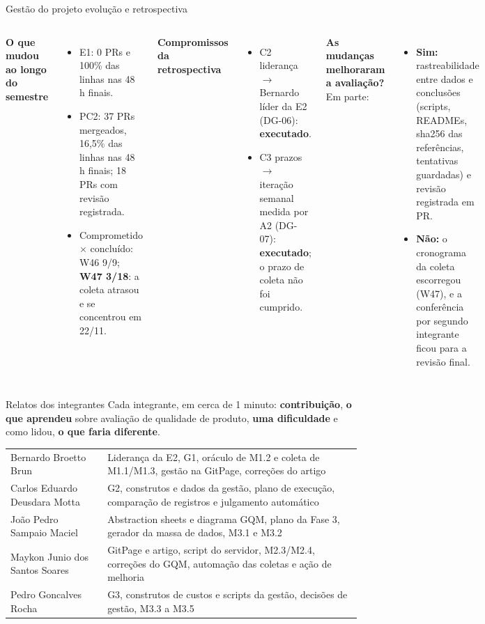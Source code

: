\documentclass[aspectratio=169,10pt]{beamer}
\begin{document}
\begin{frame}{Gestão do projeto \textperiodcentered{} evolução e retrospectiva}
\small
\begin{columns}[T]
\textbf{O que mudou ao longo do semestre}
\begin{itemize}\scriptsize
\item E1: 0 PRs e 100\% das linhas nas 48 h finais.
\item PC2: 37 PRs mergeados, 16,5\% das linhas nas 48 h finais; 18 PRs com revisão registrada.
\item Comprometido $\times$ concluído: W46 9/9; \textbf{W47 3/18}: a coleta atrasou e se concentrou em 22/11.
\end{itemize}
\textbf{Compromissos da retrospectiva}
\begin{itemize}\scriptsize
\item C2 liderança $\rightarrow$ Bernardo líder da E2 (DG-06): \textbf{executado}.
\item C3 prazos $\rightarrow$ iteração semanal medida por A2 (DG-07): \textbf{executado}; o prazo de coleta não foi cumprido.
\end{itemize}
\textbf{As mudanças melhoraram a avaliação?} Em parte:
\begin{itemize}\scriptsize
\item \textbf{Sim:} rastreabilidade entre dados e conclusões (scripts, READMEs, sha256 das referências, tentativas guardadas) e revisão registrada em PR.
\item \textbf{Não:} o cronograma da coleta escorregou (W47), e a conferência por segundo integrante ficou para a revisão final.
\end{itemize}
\end{columns}
\end{frame}

\begin{frame}{Relatos dos integrantes}
\scriptsize
Cada integrante, em cerca de 1 minuto: \textbf{contribuição}, \textbf{o que aprendeu} sobre avaliação de qualidade de produto, \textbf{uma dificuldade} e como lidou, \textbf{o que faria diferente}.\\[0.6em]
\begin{tabularx}{\linewidth}{p{3.6cm}L}
\toprule
Bernardo Broetto Brun & Liderança da E2, G1, oráculo de M1.2 e coleta de M1.1/M1.3, gestão na GitPage, correções do artigo \\
Carlos Eduardo Deusdara Motta & G2, construtos e dados da gestão, plano de execução, comparação de registros e julgamento automático \\
João Pedro Sampaio Maciel & Abstraction sheets e diagrama GQM, plano da Fase 3, gerador da massa de dados, M3.1 e M3.2 \\
Maykon Junio dos Santos Soares & GitPage e artigo, script do servidor, M2.3/M2.4, correções do GQM, automação das coletas e ação de melhoria \\
Pedro Goncalves Rocha & G3, construtos de custos e scripts da gestão, decisões de gestão, M3.3 a M3.5 \\
\bottomrule
\end{tabularx}
\end{frame}
\end{document}
